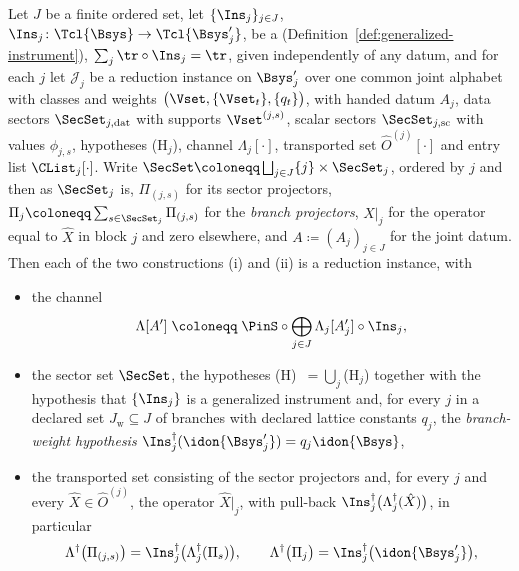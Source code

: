 \begin{theorem}\label{thm:instrument-instance}
Let $J$ be a finite ordered set, let $\{\Ins_j\}_{j\in J}$,
$\Ins_j\colon\Tcl{\Bsys}\to\Tcl{\Bsys'_j}$, be a
 (Definition~\ref{def:generalized-instrument}),
$\sum_j\tr\circ\Ins_j=\tr$, given independently of any datum, and for each
$j$ let $\mathcal{J}_j$ be a reduction instance on $\Bsys'_j$ over one common
joint alphabet with classes and weights $\big(\Vset,\{\Vset_t\},\{q_t\}\big)$,
with handed datum $A_j$, data sectors $\SecSet_{j,\mathrm{dat}}$ with supports
$\Vset^{(j,s)}$, scalar sectors $\SecSet_{j,\mathrm{sc}}$ with values
$\phi_{j,s}$, hypotheses (H$_j$), channel $\Lambda_j[\cdot]$, transported set
$\hat O^{(j)}[\cdot]$ and entry list $\CList_j[\cdot]$. Write
$\SecSet\coloneqq\bigsqcup_{j\in J}\{j\}\times\SecSet_j$, ordered by $j$ and
then as $\SecSet_j$ is, $\Pi_{(j,s)}$ for its sector projectors,
$\Pi_j\coloneqq\sum_{s\in\SecSet_j}\Pi_{(j,s)}$ for the \emph{branch
projectors}, $\hat X|_j$ for the operator equal to $\hat X$ in block $j$ and
zero elsewhere, and $A\coloneqq(A_j)_{j\in J}$ for the joint datum. Then each
of the two constructions (i) and (ii) is a reduction instance, with
\begin{itemize}[leftmargin=2.2em]
\item the channel
  \begin{equation}\label{eq:instrument-channel}
    \Lambda[A']\;\coloneqq\;\PinS\circ\bigoplus_{j\in J}\Lambda_j[A'_j]\circ\Ins_j ,
  \end{equation}
\item the sector set $\SecSet$, the hypotheses (H)~$=\bigcup_j$(H$_j$)
  together with the hypothesis that $\{\Ins_j\}$ is a generalized
  instrument and, for every $j$ in a declared set $J_{\mathrm{w}}\subseteq J$
  of branches with declared lattice constants $q_j$, the
  \emph{branch-weight hypothesis}
  $\Ins_j^{\dagger}(\idon{\Bsys'_j})=q_j\idon{\Bsys}$,
\item the transported set consisting of the sector projectors and, for every
  $j$ and every $\hat X\in\hat O^{(j)}$, the operator $\hat X|_j$, with
  pull-back $\Ins_j^{\dagger}\big(\Lambda_j^{\dagger}(\hat X)\big)$, in
  particular
  \begin{equation}\label{eq:instrument-transport}
    \Lambda^{\dagger}\big(\Pi_{(j,s)}\big)
    =\Ins_j^{\dagger}\big(\Lambda_j^{\dagger}(\Pi_s)\big),
    \qquad
    \Lambda^{\dagger}\big(\Pi_j\big)=\Ins_j^{\dagger}\big(\idon{\Bsys'_j}\big) ,
  \end{equation}

\end{itemize}
\end{theorem}
